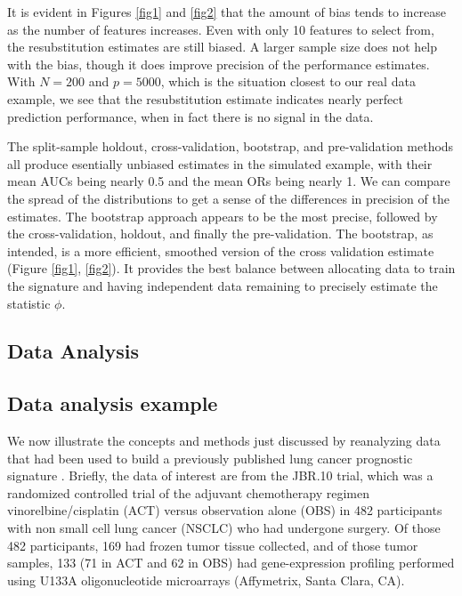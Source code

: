 \documentclass[11pt,]{article}
\begin{document}
It is evident in Figures \ref{fig1} and \ref{fig2} that the amount of
bias tends to increase as the number of features increases. Even with
only 10 features to select from, the resubstitution estimates are still
biased. A larger sample size does not help with the bias, though it does
improve precision of the performance estimates. With \(N = 200\) and
\(p = 5000\), which is the situation closest to our real data example,
we see that the resubstitution estimate indicates nearly perfect
prediction performance, when in fact there is no signal in the data.

The split-sample holdout, cross-validation, bootstrap, and
pre-validation methods all produce esentially unbiased estimates in the
simulated example, with their mean AUCs being nearly 0.5 and the mean
ORs being nearly 1. We can compare the spread of the distributions to
get a sense of the differences in precision of the estimates. The
bootstrap approach appears to be the most precise, followed by the
cross-validation, holdout, and finally the pre-validation. The
bootstrap, as intended, is a more efficient, smoothed version of the
cross validation estimate (Figure \ref{fig1}, \ref{fig2}). It provides
the best balance between allocating data to train the signature and
having independent data remaining to precisely estimate the statistic
\(\phi\).

\subsection{Data Analysis}\label{data-analysis}

\subsection{Data analysis example}\label{data-analysis-example}

We now illustrate the concepts and methods just discussed by reanalyzing
data that had been used to build a previously published lung cancer
prognostic signature \citet{zhu2010prognostic}. Briefly, the data of
interest are from the JBR.10 trial, which was a randomized controlled
trial of the adjuvant chemotherapy regimen vinorelbine/cisplatin (ACT)
versus observation alone (OBS) in 482 participants with non small cell
lung cancer (NSCLC) who had undergone surgery. Of those 482
participants, 169 had frozen tumor tissue collected, and of those tumor
samples, 133 (71 in ACT and 62 in OBS) had gene-expression profiling
performed using U133A oligonucleotide microarrays (Affymetrix, Santa
Clara, CA).
\end{document}

